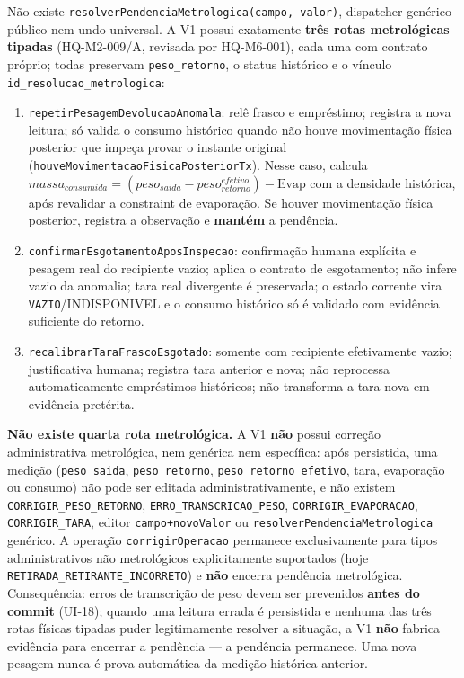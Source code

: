 \begin{regra}
Não existe \texttt{resolverPendenciaMetrologica(campo, valor)}, dispatcher genérico público nem undo universal. A V1 possui exatamente \textbf{três rotas metrológicas tipadas} (HQ-M2-009/A, revisada por HQ-M6-001), cada uma com contrato próprio; todas preservam \texttt{peso\_retorno}, o status histórico e o vínculo \texttt{id\_resolucao\_metrologica}:
\begin{enumerate}
    \item \texttt{repetirPesagemDevolucaoAnomala}: relê frasco e empréstimo; registra a nova leitura; só valida o consumo histórico quando não houve movimentação física posterior que impeça provar o instante original (\texttt{houveMovimentacaoFisicaPosteriorTx}). Nesse caso, calcula $massa_{consumida}=(peso_{saida}-peso_{retorno}^{efetivo})-\text{Evap}$ com a densidade histórica, após revalidar a constraint de evaporação. Se houver movimentação física posterior, registra a observação e \textbf{mantém} a pendência.
    \item \texttt{confirmarEsgotamentoAposInspecao}: confirmação humana explícita e pesagem real do recipiente vazio; aplica o contrato de esgotamento; não infere vazio da anomalia; tara real divergente é preservada; o estado corrente vira \texttt{VAZIO}/INDISPONIVEL e o consumo histórico só é validado com evidência suficiente do retorno.
    \item \texttt{recalibrarTaraFrascoEsgotado}: somente com recipiente efetivamente vazio; justificativa humana; registra tara anterior e nova; não reprocessa automaticamente empréstimos históricos; não transforma a tara nova em evidência pretérita.
\end{enumerate}
\textbf{Não existe quarta rota metrológica.} A V1 \textbf{não} possui correção administrativa metrológica, nem genérica nem específica: após persistida, uma medição (\texttt{peso\_saida}, \texttt{peso\_retorno}, \texttt{peso\_retorno\_efetivo}, tara, evaporação ou consumo) não pode ser editada administrativamente, e não existem \texttt{CORRIGIR\_PESO\_RETORNO}, \texttt{ERRO\_TRANSCRICAO\_PESO}, \texttt{CORRIGIR\_EVAPORACAO}, \texttt{CORRIGIR\_TARA}, editor \texttt{campo+novoValor} ou \texttt{resolverPendenciaMetrologica} genérico. A operação \texttt{corrigirOperacao} permanece exclusivamente para tipos administrativos não metrológicos explicitamente suportados (hoje \texttt{RETIRADA\_RETIRANTE\_INCORRETO}) e \textbf{não} encerra pendência metrológica. Consequência: erros de transcrição de peso devem ser prevenidos \textbf{antes do commit} (UI-18); quando uma leitura errada é persistida e nenhuma das três rotas físicas tipadas puder legitimamente resolver a situação, a V1 \textbf{não} fabrica evidência para encerrar a pendência — a pendência permanece. Uma nova pesagem nunca é prova automática da medição histórica anterior.

\end{regra}
